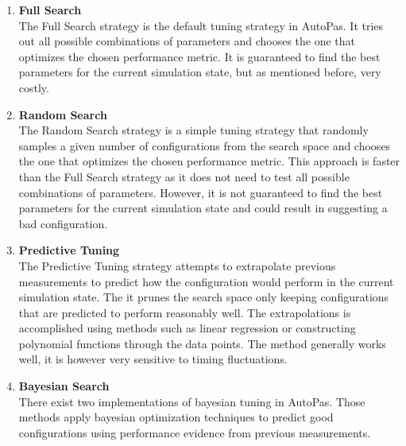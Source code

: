 \begin{enumerate}
      \item \textbf{Full Search} \\
            The Full Search strategy is the default tuning strategy in AutoPas. It tries out all possible combinations of parameters and chooses the one that optimizes the chosen performance metric. It is guaranteed to find the best parameters for the current simulation state, but as mentioned before, very costly.

      \item \textbf{Random Search} \\
            The Random Search strategy is a simple tuning strategy that randomly samples a given number of configurations from the search space and chooses the one that optimizes the chosen performance metric. This approach is faster than the Full Search strategy as it does not need to test all possible combinations of parameters. However, it is not guaranteed to find the best parameters for the current simulation state and could result in suggesting a bad configuration.

      \item \textbf{Predictive Tuning} \\
            The Predictive Tuning strategy attempts to extrapolate previous measurements to predict how the configuration would perform in the current simulation state. The it prunes the search space only keeping configurations that are predicted to perform reasonably well. The extrapolations is accomplished using methods such as linear regression or constructing polynomial functions through the data points. The method generally works well, it is however very sensitive to timing fluctuations.

      \item \textbf{Bayesian Search} \\
            There exist two implementations of bayesian tuning in AutoPas. Those methods apply bayesian optimization techniques to predict good configurations using performance evidence from previous measurements.


\end{enumerate}
